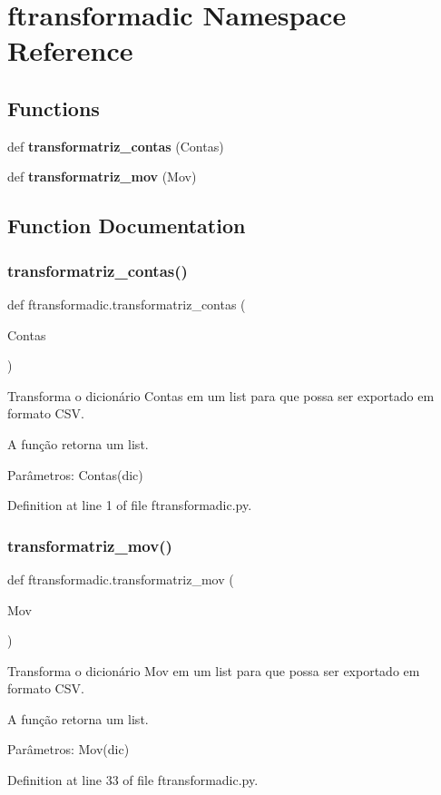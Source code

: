 \section{ftransformadic Namespace Reference}
\label{namespaceftransformadic}
\subsection*{Functions}
\begin{DoxyCompactItemize}
\item 
def \textbf{ transformatriz\+\_\+contas} (Contas)
\item 
def \textbf{ transformatriz\+\_\+mov} (Mov)
\end{DoxyCompactItemize}


\subsection{Function Documentation}
\mbox{\label{namespaceftransformadic_add68464cdd658c08c426916406bca477}} 
\subsubsection{transformatriz\_contas()}
{\footnotesize\ttfamily def ftransformadic.\+transformatriz\+\_\+contas (\begin{DoxyParamCaption}\item[{}]{Contas }\end{DoxyParamCaption})}

\begin{DoxyVerb}Transforma o dicionário Contas em um list para que possa ser exportado em formato CSV.

A função retorna um list.

Parâmetros:
Contas(dic)\end{DoxyVerb}
 

Definition at line 1 of file ftransformadic.\+py.

\mbox{\label{namespaceftransformadic_a7e330d49f9f0c0cc7b1a64cec9272ce0}} 
\subsubsection{transformatriz\_mov()}
{\footnotesize\ttfamily def ftransformadic.\+transformatriz\+\_\+mov (\begin{DoxyParamCaption}\item[{}]{Mov }\end{DoxyParamCaption})}

\begin{DoxyVerb}Transforma o dicionário Mov em um list para que possa ser exportado em formato CSV.

A função retorna um list.

Parâmetros:
Mov(dic)\end{DoxyVerb}
 

Definition at line 33 of file ftransformadic.\+py.

